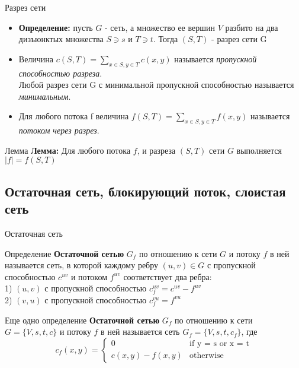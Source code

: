 \documentclass{beamer}
\begin{document}
\begin{frame}{Разрез сети}
  \begin{itemize}
    \item {
        \textbf{Определение: } пусть $G$ - сеть, а множество ее вершин $V$ разбито на два дизъюнктых множества $S \ni s$ и $T \ni t$. Тогда $(S,T)$ - разрез сети G
        \pause
    }
    \item {
        Величина $c(S, T) =  \sum\limits_{x \in S, y \in T} c(x, y)$ называется \emph{пропускной способностью разреза}. \\ Любой разрез сети G с минимальной пропускной способностью называется \emph{минимальным}.
    }
    \item {
        Для любого потока f величина $f(S, T) =  \sum\limits_{x \in S, y \in T} f(x, y)$ называется \emph{потоком через разрез}.
        \pause
    }
    \end{itemize}
    \begin{block}{Лемма}
        \textbf{Лемма: } Для любого потока $f$, и разреза $(S, T)$ сети $G$ выполняется $|f| = f(S, T)$
    \end{block}
\end{frame}

\subsection{Остаточная сеть, блокирующий поток, слоистая сеть}

\begin{frame}{Остаточная сеть}
    \begin{exampleblock}{Определение}
        \textbf{Остаточной сетью} $G_{f}$ по отношению к сети $G$ и потоку $f$ в ней называется сеть, в которой каждому ребру $(u, v) \in G$ с пропускной способностью $c^{uv}$ и потоком $f^{uv}$ соответствует два ребра: \\
            1) $(u, v)$ с пропускной способностью $c_{f}^{uv} = c^{uv} - f^{uv}$\\
            2) $(v, u)$ с пропускной способностью $c_{f}^{vu} = f^{vu}$
    \end{exampleblock}
    \pause
    \begin{exampleblock}{Еще одно определение}
        \textbf{Остаточной сетью} $G_{f}$ по отношению к сети $G = \{V, s, t, c\}$ и потоку $f$ в ней называется сеть $G_{f} = \{V, s, t, c_{f}\}$, где 
        \begin{equation*}
        c_{f}(x, y) = 
         \begin{cases}
           0 &\text{if y = s or x = t}\\
           c(x, y) - f(x, y) &\text{otherwise}
         \end{cases}
        \end{equation*}
    \end{exampleblock}
\end{frame}
\end{document}
